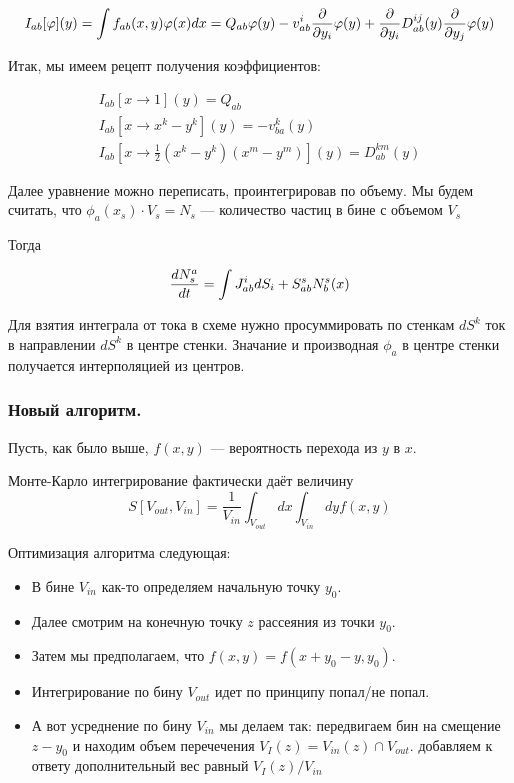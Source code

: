 \begin{equation*}
	I_{ab}[\varphi](y) = \int{f_{ab}(x,y)\varphi(x) dx} = Q_{ab}\varphi(y) - v^i_{ab}\frac{\partial }{\partial y_i}  \varphi(y) + \frac{\partial }{\partial y_i} D^{ij}_{ab}(y) \frac{\partial }{\partial y_j} \varphi(y)
\end{equation*}

Итак, мы имеем рецепт получения коэффициентов:

\begin{eqnarray*}
	I_{ab}[x \to 1](y)  = Q_{ab} \\
	I_{ab}[x \to x^k-y^k](y) = -v^k_{ba}(y) \\
	I_{ab}[x \to \frac{1}{2}(x^k-y^k)(x^m-y^m)](y) = D^{km}_{ab}(y)
\end{eqnarray*}

Далее уравнение можно переписать, проинтегрировав по объему. Мы будем считать, что $\phi_a(x_s)\cdot V_s = N_s$ --- количество частиц в бине с объемом $V_s$

Тогда

\begin{equation*}
	\frac{d N_{s}^a}{d t} = \int{J^i_{ab} dS_i} + S_{ab}^s N_b^s(x)
\end{equation*}

Для взятия интеграла от тока в схеме нужно просуммировать по стенкам $dS^k$ ток в направлении $dS^k$ в центре стенки. Значание и производная $\phi_a$ в центре стенки получается интерполяцией из центров.

\subsubsection{Новый алгоритм.}

Пусть, как было выше, $f(x,y)$ --- вероятность перехода из $y$ в $x$.

Монте-Карло интегрирование фактически даёт величину 
\begin{equation*}
	S[V_{out},V_{in}] = \frac{1}{V_{in}}\int_{V_{out}}{dx\int_{V_{in}}{dy f(x,y)}}
\end{equation*}

Оптимизация алгоритма следующая: 
\begin{itemize}
	\item В бине $V_{in}$ как-то определяем начальную точку $y_0$.
	\item Далее смотрим на конечную точку $z$ рассеяния из точки $y_0$.
	\item Затем мы предполагаем, что $f(x,y) = f(x + y_0 - y,y_0)$.
	\item Интегрирование по бину $V_{out}$ идет по принципу попал/не попал.
	\item А вот усреднение по бину $V_{in}$ мы делаем так: передвигаем бин на смещение $z-y_0$ и находим объем перечечения $V_I(z) = V_{in}(z) \cap V_{out}$. добавляем к ответу дополнительный вес равный $V_I(z)/V_{in}$
\end{itemize}

